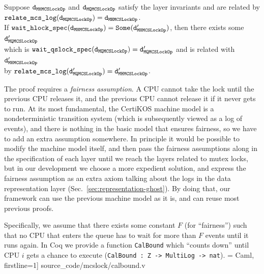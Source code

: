 \begin{theorem}
  \label{thm:mcs_wait_lock_exist}
  Suppose ${\mathrm{\texttt{{d}}}}_{\scriptsize{\mathrm{\texttt{{MHMCSLockOp}}}}}$ and ${\mathrm{\texttt{{d}}}}_{\scriptsize{\mathrm{\texttt{{MQMCSLockOp}}}}}$ satisfy the layer
  invariants and are related by ${\mathrm{\texttt{{relate\_mcs\_log}}}}({\mathrm{\texttt{{d}}}}_{\scriptsize{\mathrm{\texttt{{{MQMCSLockOp}}}}}}) = 
  {\mathrm{\texttt{{d}}}}_{\scriptsize{\mathrm{\texttt{{MHMCSLockOp}}}}}$. \\
If ${\mathrm{\texttt{{wait\_hlock\_spec}}}}({\mathrm{\texttt{{d}}}}_{\scriptsize{\mathrm{\texttt{{MHMCSLockOp}}}}}) = {\mathrm{\texttt{{Some}}}}({\mathrm{\texttt{{d}}}}'_{\scriptsize{\mathrm{\texttt{{MHMCSLockOp}}}}})$, then there exists some ${\mathrm{\texttt{{d}}}}'_{\scriptsize{\mathrm{\texttt{{MQMCSLockOp}}}}}$\\
  which is ${\mathrm{\texttt{{wait\_qslock\_spec}}}}({\mathrm{\texttt{{d}}}}_{\scriptsize{\mathrm{\texttt{{MQMCSLockOp}}}}}) = {\mathrm{\texttt{{d}}}}'_{\scriptsize{\mathrm{\texttt{{MQMCSLockOp}}}}}$ and is related with ${\mathrm{\texttt{{d}}}}'_{\scriptsize{\mathrm{\texttt{{MHMCSLockOp}}}}}$\\
   by ${\mathrm{\texttt{{relate\_mcs\_log}}}}({\mathrm{\texttt{{d}}}}'_{\scriptsize{\mathrm{\texttt{{MQMCSLockOp}}}}}) = {\mathrm{\texttt{{d}}}}'_{\scriptsize{\mathrm{\texttt{{MHMCSLockOp}}}}}$.
\end{theorem}

The proof  requires a \emph{fairness assumption}.
A CPU cannot take the lock until the previous CPU releases it, 
and the previous CPU cannot release it if it never gets to run. 
At its most fundamental, the CertiKOS machine model is a nondeterministic 
transition system (which is subsequently viewed as a log of events), 
and there is nothing in the basic model that ensures fairness, 
so we have to add an extra assumption somewhere. In principle it would be 
possible to modify the machine model itself, and then pass the fairness assumptions 
along in the specification of each layer until we reach the layers related to mutex locks, 
but in our development we choose a more expedient solution, and express
the fairness assumption as an extra axiom talking about the logs 
in the data representation layer (Sec.~\ref{sec:representation-ghost}). 
By doing that, our framework can use the previous machine 
model as it is, and can reuse most previous proofs.

Specifically, we assume that there exists some constant $F$ (for ``fairness'') such that no CPU that enters the queue has to wait for more than $F$ events until it runs again. 
In Coq we provide a function \lstinline$CalBound$ which ``counts down'' 
until CPU $i$ gets a chance to 
execute (\lstinline$CalBound : Z -> MultiLog -> nat$).
 = Caml, firstline=1] {source_code/mcslock/calbound.v}


